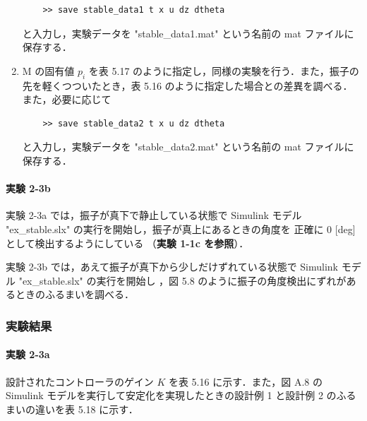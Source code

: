 \begin{enumerate}
        \begin{tcolorbox}[colback=gray!5!white,colframe=gray!75!black]
          \begin{lstlisting}
    >> save stable_data1 t x u dz dtheta
    \end{lstlisting}
        \end{tcolorbox}
        
        と入力し，実験データを "stable\_data1.mat" という名前の mat ファイルに保存する．
        
  \item M の固有値 \( p_i \) を表 5.17 のように指定し，同様の実験を行う．また，振子の先を軽くつついたとき，表 5.16 のように指定した場合との差異を調べる．また，必要に応じて
        
        \begin{tcolorbox}[colback=gray!5!white,colframe=gray!75!black]
          \begin{lstlisting}
    >> save stable_data2 t x u dz dtheta
    \end{lstlisting}
        \end{tcolorbox}
        
        と入力し，実験データを "stable\_data2.mat" という名前の mat ファイルに保存する．
\end{enumerate}

\paragraph{実験 2-3b}
実験 2-3a では，振子が真下で静止している状態で Simulink モデル 
"ex\_stable.slx" の実行を開始し，振子が真上にあるときの角度を
正確に 0 [deg] として検出するようにしている
（\textbf{実験 1-1c を参照}）．

実験 2-3b では，あえて振子が真下から少しだけずれている状態で
Simulink モデル "ex\_stable.slx" の実行を開始し
，図 5.8 のように振子の角度検出にずれがあるときのふるまいを調べる．

\subsubsection{実験結果}

\paragraph{実験 2-3a}
設計されたコントローラのゲイン \( K \) を表 5.16 に示す．また，図 A.8 の Simulink モデルを実行して安定化を実現したときの設計例 1 と設計例 2 のふるまいの違いを表 5.18 に示す．

